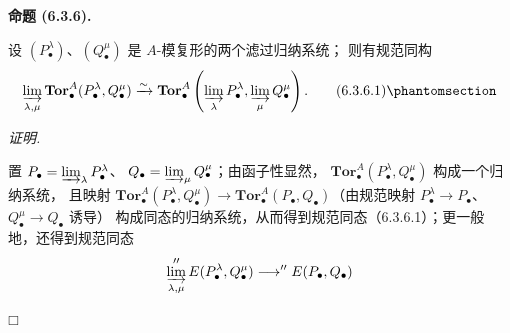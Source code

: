 \documentclass[UTF8,fontset=none,11pt,oneside,openany]{ctexbook}
\providecommand{\square}{\mdlgwhtsquare}
\newenvironment{proposition}[1][]{%
  \par\medskip\noindent\textbf{命题 (#1).}\ %
}{\par}
\newenvironment{proof}{%
  \par\smallskip\noindent\textit{证明.}\ %
}{\hfill$\square$\par}
\newcommand{\oldpage}[2][]{%
  \hypertarget{ega-source-page-#1-#2}{}%
  \marginnote{\scriptsize\textbf{#1}~|~#2}\ignorespaces}
\let\EGAOriginalLabel\label
\renewcommand{\label}[1]{\phantomsection\EGAOriginalLabel{#1}}
\begin{document}
\begin{proposition}[6.3.6]
设 $(P_\bullet^\lambda)$、$(Q_\bullet^\mu)$ 是 $A$-模复形的两个滤过归纳系统；
则有规范同构
\[
  \varinjlim_{\lambda,\mu}
  \mathbf{Tor}_\bullet^A(P_\bullet^\lambda,Q_\bullet^\mu)
  \xrightarrow{\sim}
  \mathbf{Tor}_\bullet^A
  \left(\varinjlim_\lambda P_\bullet^\lambda,
        \varinjlim_\mu Q_\bullet^\mu\right).
  \tag{6.3.6.1}\label{III.6.3.6.1-fr}
\]
\end{proposition}

\begin{proof}
置 $P_\bullet=\varinjlim_\lambda P_\bullet^\lambda$、
$Q_\bullet=\varinjlim_\mu Q_\bullet^\mu$；由函子性显然，
$\mathbf{Tor}_\bullet^A(P_\bullet^\lambda,Q_\bullet^\mu)$ 构成一个归纳系统，
且映射
$\mathbf{Tor}_\bullet^A(P_\bullet^\lambda,Q_\bullet^\mu)\to
\mathbf{Tor}_\bullet^A(P_\bullet,Q_\bullet)$（由规范映射
$P_\bullet^\lambda\to P_\bullet$、$Q_\bullet^\mu\to Q_\bullet$ 诱导）
构成同态的归纳系统，从而得到规范同态（6.3.6.1）；更一般地，还得到规范同态
\[
  \varinjlim_{\lambda,\mu}''E(P_\bullet^\lambda,Q_\bullet^\mu)
  \longrightarrow ''E(P_\bullet,Q_\bullet)
\]

\oldpage[III]{143}


\end{proof}
\end{document}
